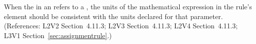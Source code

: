 When the  in an \AssignmentRule refers to a \Parameter, the
units of the mathematical expression in the rule's  element
should be consistent with the units declared for that parameter.
(References: L2V2 Section~4.11.3; L2V3 Section~4.11.3; L2V4 Section~4.11.3;
L3V1 Section~\ref{sec:assignmentrule}.)
